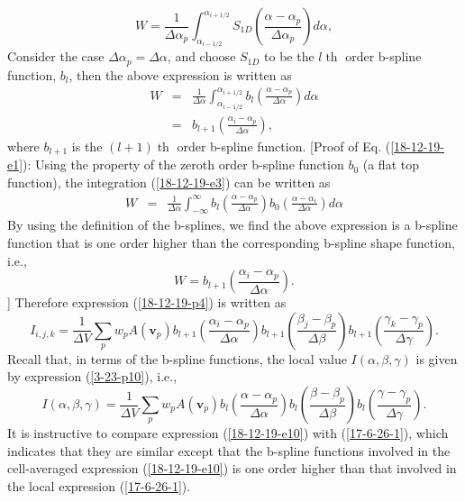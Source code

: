 \documentclass{article}
\newcommand{\tmop}[1]{\ensuremath{\operatorname{#1}}}
\begin{document}
\begin{equation}
  W = \frac{1}{\Delta \alpha_p} \int_{\alpha_{i - 1 / 2}}^{\alpha_{i + 1 / 2}}
  S_{1 D} \left( \frac{\alpha - \alpha_p}{\Delta \alpha_p} \right) d \alpha,
\end{equation}
Consider the case $\Delta \alpha_p = \Delta \alpha$, and choose $S_{1 D}$ to
be the $l \tmop{th}$ order b-spline function, $b_l$, then the above expression
is written as
\begin{eqnarray}
  W & = & \frac{1}{\Delta \alpha} \int_{\alpha_{i - 1 / 2}}^{\alpha_{i + 1 /
  2}} b_l \left( \frac{\alpha - \alpha_p}{\Delta \alpha} \right) d \alpha 
  \label{18-12-19-e3}\\
  & = & b_{l + 1} \left( \frac{\alpha_i - \alpha_p}{\Delta \alpha} \right), 
  \label{18-12-19-e1}
\end{eqnarray}
where $b_{l + 1}$ is the $(l + 1) \tmop{th}$ order b-spline function. [Proof
of Eq. (\ref{18-12-19-e1}): Using the property of the zeroth order b-spline
function $b_0$ (a flat top function), the integration (\ref{18-12-19-e3}) can
be written as
\begin{eqnarray*}
  W & = & \frac{1}{\Delta \alpha} \int_{- \infty}^{\infty} b_l \left(
  \frac{\alpha - \alpha_p}{\Delta \alpha} \right) b_0 \left( \frac{\alpha -
  \alpha_i}{\Delta \alpha} \right) d \alpha
\end{eqnarray*}
By using the definition of the b-splines, we find the above expression is a
b-spline function that is one order higher than the corresponding b-spline
shape function, i.e.,
\[ W = b_{l + 1} \left( \frac{\alpha_i - \alpha_p}{\Delta \alpha} \right) . \]
] Therefore expression (\ref{18-12-19-p4}) is written as
\begin{equation}
  \label{18-12-19-e10} I_{i, j, k} = \frac{1}{\Delta V} \sum_p w_p A
  (\mathbf{v}_p) b_{l + 1} \left( \frac{\alpha_i - \alpha_p}{\Delta \alpha}
  \right) b_{l + 1} \left( \frac{\beta_j - \beta_p}{\Delta \beta} \right) b_{l
  + 1} \left( \frac{\gamma_k - \gamma_p}{\Delta \gamma} \right) .
\end{equation}
Recall that, in terms of the b-spline functions, the local value $I (\alpha,
\beta, \gamma)$ is given by expression (\ref{3-23-p10}), i.e.,
\begin{equation}
  \label{17-6-26-1} I (\alpha, \beta, \gamma) = \frac{1}{\Delta V} \sum_p w_p
  A (\mathbf{v}_p) b_l \left( \frac{\alpha - \alpha_p}{\Delta \alpha} \right)
  b_l \left( \frac{\beta - \beta_p}{\Delta \beta} \right) b_l \left(
  \frac{\gamma - \gamma_p}{\Delta \gamma} \right) .
\end{equation}
It is instructive to compare expression (\ref{18-12-19-e10}) with
(\ref{17-6-26-1}), which indicates that they are similar except that the
b-spline functions involved in the cell-averaged expression
(\ref{18-12-19-e10}) is one order higher than that involved in the local
expression (\ref{17-6-26-1}).
\end{document}
